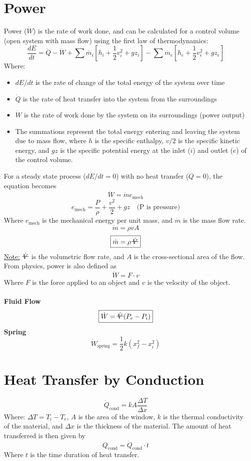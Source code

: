 \documentclass[10pt, fleqn]{article}
\newcommand{\vol}{\mathord{\text{\ooalign{\hidewidth $V$\hidewidth\cr\kern-0.5pt\raisebox{0.8ex}{\rule[0pt]{1em}{0.5pt}}}}}}
\begin{document}
\section*{Power}
Power ($\dot{W}$) is the rate of work done, and can be calculated for a control volume (open system with mass flow) using the first law of thermodynamics:
\[\boxed{\frac{dE}{dt} = \dot{Q}-\dot{W}+\sum \dot{m_i}\left[h_i+\frac{1}{2}v_i^2+g z_i\right]-\sum \dot{m_e}\left[h_e+\frac{1}{2}v_e^2+g z_e\right]}\]
Where:
\begin{itemize}
\item $dE/dt$ is the rate of change of the total energy of the system over time
\item $\dot{Q}$ is the rate of heat transfer into the system from the surroundings
\item $\dot{W}$ is the rate of work done by the system on its surroundings (power output)
\item The summations represent the total energy entering and leaving the system due to mass flow, where $h$ is the specific enthalpy, $v/2$ is the specific kinetic energy, and $gz$ is the specific potential energy at the inlet ($i$) and outlet ($e$) of the control volume.
\end{itemize}
For a steady state process ($dE/dt = 0$) with no heat transfer ($\dot{Q}=0$), the equation becomes
\[\dot{W} = \dot{m} e_{\text{mech}}\]
\[e_{\text{mech}} = \frac{P}{\rho} +\frac{v^2}{2}+gz \quad \text{(P is pressure)}\]
Where $e_{\text{mech}}$ is the mechanical energy per unit mass, and $\dot{m}$ is the mass flow rate. 
\[\boxed{\dot{m}= \rho v A}\]
\[\boxed{\dot{m}= \rho\, \dot{\vol}}\]
\underline{Note:} $\dot{\vol}$ is the volumetric flow rate, and $A$ is the cross-sectional area of the flow.\\
From physics, power is also defined as 
\[\dot{W} = F \cdot v\]
Where $F$ is the force applied to an object and $v$ is the velocity of the object.\\\\
\textbf{Fluid Flow}
\[\boxed{\dot{W} = \dot{\vol}(P_e - P_i)}\]
\textbf{Spring}
\[\boxed{\dot{W}_{\text{spring}} = \frac{1}{2} k (x_f^2 - x_i^2)}\]
\section*{Heat Transfer by Conduction}
\[\boxed{\dot{Q}_{\text{cond}} = kA\frac{\Delta T}{\Delta x}}\]
Where: $\Delta T = T_i - T_e$, $A$ is the area of the window, $k$ is the thermal conductivity of the material, and $\Delta x$ is the thickness of the material. The amount of heat transferred is then given by
\[\boxed{Q_{\text{cond}} = \dot{Q}_{\text{cond}} \cdot t}\]
Where $t$ is the time duration of heat transfer.
\end{document}
